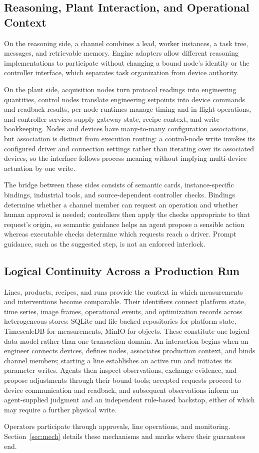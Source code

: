 \subsection{Reasoning, Plant Interaction, and Operational Context}
On the reasoning side, a channel combines a lead, worker instances, a task tree,
messages, and retrievable memory. Engine adapters allow different reasoning
implementations to participate without changing a bound node's identity or the
controller interface, which separates task organization from device authority.

On the plant side, acquisition nodes turn protocol readings into engineering
quantities, control nodes translate engineering setpoints into device commands and
readback results, per-node runtimes manage timing and in-flight operations, and
controller services supply gateway state, recipe context, and write bookkeeping.
Nodes and devices have many-to-many configuration associations, but association is
distinct from execution routing: a control-node write invokes its configured driver
and connection settings rather than iterating over its associated devices, so the
interface follows process meaning without implying multi-device actuation by one
write.

The bridge between these sides consists of semantic cards, instance-specific
bindings, industrial tools, and source-dependent controller checks. Bindings
determine whether a channel member can request an operation and whether human
approval is needed; controllers then apply the checks appropriate to that request's
origin, so semantic guidance helps an agent propose a sensible action whereas
executable checks determine which requests reach a driver. Prompt guidance, such as
the suggested step, is not an enforced interlock.

\subsection{Logical Continuity Across a Production Run}
Lines, products, recipes, and runs provide the context in which measurements and
interventions become comparable. Their identifiers connect platform state, time
series, image frames, operational events, and optimization records across
heterogeneous stores: SQLite and file-backed repositories for platform state,
TimescaleDB for measurements, MinIO for objects. These constitute one logical data
model rather than one transaction domain. An interaction begins when an engineer
connects devices, defines nodes, associates production context, and binds channel
members; starting a line establishes an active run and initiates its parameter
writes. Agents then inspect observations, exchange evidence, and propose adjustments
through their bound tools; accepted requests proceed to device communication and
readback, and subsequent observations inform an agent-supplied judgment and an
independent rule-based backstop, either of which may require a further physical
write.

Operators participate through approvals, line operations, and monitoring.
Section~\ref{sec:mech} details these mechanisms and marks where their guarantees
end.
